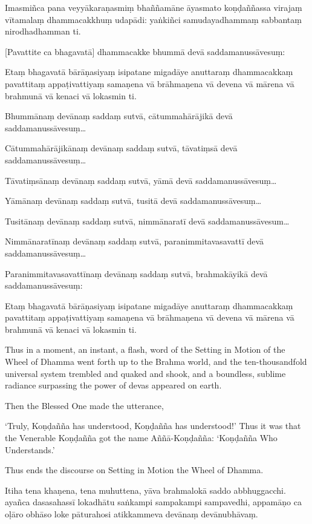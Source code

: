Imasmiñca pana veyyākaraṇasmiṃ bhaññamāne āyasmato koṇḍaññassa virajaṃ
vītamalaṃ dhammacakkhuṃ udapādi: yaṅkiñci samudayadhammaṃ sabbantaṃ
nirodhadhamman ti.

[Pavattite ca bhagavatā] dhammacakke bhummā devā saddamanussāvesuṃ:

Etaṃ bhagavatā bārāṇasiyaṃ isipatane migadāye anuttaraṃ dhammacakkaṃ
pavattitaṃ appaṭivattiyaṃ samaṇena vā brāhmaṇena vā devena vā mārena vā
brahmunā vā kenaci vā lokasmin ti.

Bhummānaṃ devānaṃ saddaṃ sutvā, cātummahārājikā devā
saddamanussāvesuṃ\ldots

Cātummahārājikānaṃ devānaṃ saddaṃ sutvā, tāvatiṃsā devā
saddamanussāvesuṃ\ldots

Tāvatiṃsānaṃ devānaṃ saddaṃ sutvā, yāmā devā saddamanussāvesuṃ\ldots

Yāmānaṃ devānaṃ saddaṃ sutvā, tusitā devā saddamanussāvesuṃ\ldots

Tusitānaṃ devānaṃ saddaṃ sutvā, nimmānaratī devā saddamanussāvesum\ldots

Nimmānaratīnaṃ devānaṃ saddaṃ sutvā, paranimmitavasavattī devā
saddamanussāvesuṃ\ldots

Paranimmitavasavattīnaṃ devānaṃ saddaṃ sutvā, brahmakāyikā devā
saddamanussāvesuṃ:

Etaṃ bhagavatā bārāṇasiyaṃ isipatane migadāye anuttaraṃ dhammacakkaṃ
pavattitaṃ appaṭivattiyaṃ samaṇena vā brāhmaṇena vā devena vā mārena vā
brahmunā vā kenaci vā lokasmin ti.

\clearpage

\englishText
\markboth{\englishTitle}{\rightmark}

Thus in a moment, an instant, a flash, word of the Setting in Motion of
the Wheel of Dhamma went forth up to the Brahma world, and the
ten-thousandfold universal system trembled and quaked and shook, and a
boundless, sublime radiance surpassing the power of devas appeared on
earth.

Then the Blessed One made the utterance,

‘Truly, Koṇḍañña has understood, Koṇḍañña has understood!’ Thus it was
that the Venerable Koṇḍañña got the name Aññā-Koṇḍañña: ‘Koṇḍañña Who
Understands.’

Thus ends the discourse on Setting in Motion the Wheel of Dhamma.

\clearpage

\paliText
\markboth{\paliTitle}{\rightmark}

Itiha tena khaṇena, tena muhuttena, yāva brahmalokā saddo abbhuggacchi.
ayañca dasasahassī lokadhātu saṅkampi sampakampi sampavedhi, appamāṇo ca
oḷāro obhāso loke pāturahosi atikkammeva devānaṃ devānubhāvaṃ.

